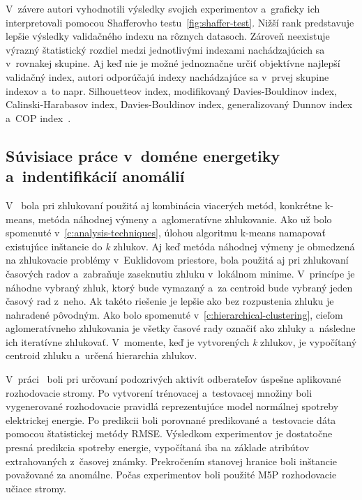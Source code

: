 \documentclass[a4paper,twoside,slovak,12pt,appendix]{article}
\begin{document}
V~závere autori vyhodnotili výsledky svojich experimentov a~graficky ich
interpretovali pomocou Shafferovho testu~\ref{fig:shaffer-test}. Nižší rank
predstavuje lepšie výsledky validačného indexu na rôznych datasoch. Zároveň
neexistuje výrazný štatistický rozdiel medzi jednotlivými indexami
nachádzajúcich sa v~rovnakej skupine. Aj keď nie je možné jednoznačne určiť
objektívne najlepší validačný index, autori odporúčajú indexy nachádzajúce sa
v~prvej skupine indexov a~to napr. Silhouetteov index, modifikovaný
Davies-Bouldinov index, Calinski-Harabasov index,  Davies-Bouldinov index,
generalizovaný Dunnov index a~COP index~\cite{Arbelaitz2013}.


\subsection{Súvisiace práce v~doméne energetiky a~indentifikácií anomálií}
V~\cite{Hautamaki2008} bola pri zhlukovaní použitá aj kombinácia viacerých
metód, konkrétne k-means, metóda náhodnej výmeny a~aglomeratívne zhlukovanie.
Ako už bolo spomenuté v~\ref{c:analysis-techniques}, úlohou algoritmu k-means
namapovať existujúce inštancie do \textit{k} zhlukov. Aj keď metóda náhodnej
výmeny je obmedzená na zhlukovacie problémy v~Euklidovom priestore, bola
použitá aj pri zhlukovaní časových radov a~zabraňuje zaseknutiu zhluku
v~lokálnom minime. V~princípe je náhodne vybraný zhluk, ktorý bude vymazaný a~za
centroid bude vybraný jeden časový rad z~neho. Ak takéto riešenie je lepšie ako
bez rozpustenia zhluku je nahradené pôvodným. Ako bolo spomenuté
v~\ref{c:hierarchical-clustering}, cieľom aglomeratívneho zhlukovania je všetky
časové rady označiť ako zhluky a~následne ich iteratívne zhlukovať. V~momente,
keď je vytvorených \textit{k} zhlukov, je vypočítaný centroid zhluku a~určená
hierarchia zhlukov.
\medskip

\noindent
V~práci~\cite{Cody2015} boli pri určovaní podozrivých aktivít odberateľov
úspešne aplikované rozhodovacie stromy. Po vytvorení trénovacej a~testovacej
množiny boli vygenerované rozhodovacie pravidlá reprezentujúce model normálnej
spotreby elektrickej energie. Po predikcii boli porovnané predikované
a~testovacie dáta pomocou štatistickej metódy RMSE. Výsledkom experimentov je
dostatočne presná predikcia spotreby energie, vypočítaná iba na základe
atribútov extrahovaných z~časovej známky. Prekročením stanovej hranice boli
inštancie považované za anomálne. Počas experimentov boli použité M5P
rozhodovacie učiace stromy.
\medskip
\end{document}
